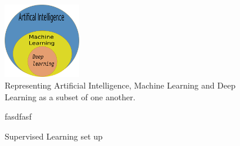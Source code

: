 \begin{figure}
    \begin{center}
        \includegraphics[width =0.3\textwidth]{figures/inkscape/aimldl.png}
    \end{center}
    \caption{Representing Artificial Intelligence, Machine Learning and Deep Learning as a
    subset of one another.}
    \label{fig:ai_ml_dl}
\end{figure}

\begin{figure}
    \centering
        \def\svgwidth{0.5\textwidth}
        \caption{fasdfasf}
\end{figure}
\begin{figure}
    \def\svgwidth{0.9\textwidth}
	\begin{center}
    \end{center}
\end{figure}

\begin{figure}
	\centering
    
    \caption{Supervised Learning set up}
    \label{fig:SL_setup}
\end{figure}


